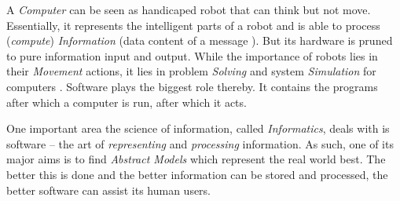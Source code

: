 A \emph{Computer} can be seen as handicaped robot that can think but not move.
Essentially, it represents the intelligent parts of a robot and is able to
process (\emph{compute}) \emph{Information} (data content of a message
\cite{duden}). But its hardware is pruned to pure information input and output.
While the importance of robots lies in their \emph{Movement} actions, it lies
in problem \emph{Solving} and system \emph{Simulation} for computers
\cite{wikipedia}. Software plays the biggest role thereby. It contains the
programs after which a computer is run, after which it acts.

One important area the science of information, called \emph{Informatics}, deals
with is software -- the art of \emph{representing} and \emph{processing}
information. As such, one of its major aims is to find \emph{Abstract Models}
which represent the real world best. The better this is done and the better
information can be stored and processed, the better software can assist its
human users.

